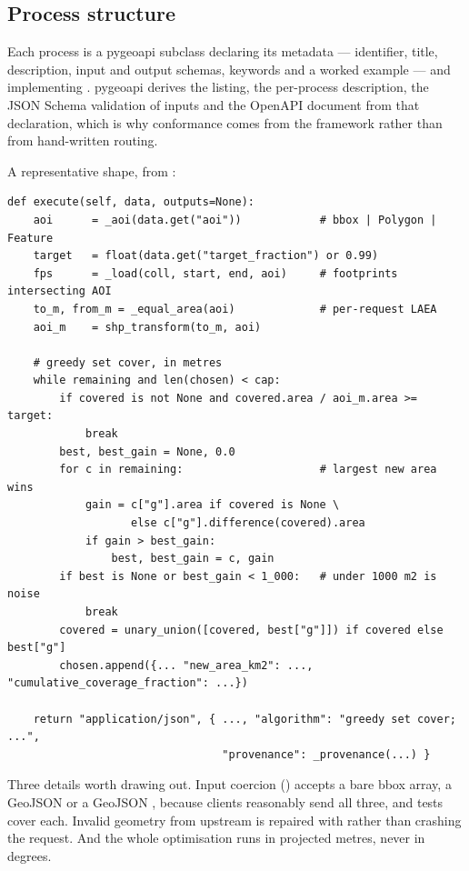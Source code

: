 \subsection{Process structure}

Each process is a pygeoapi  subclass declaring its
metadata --- identifier, title, description, input and output schemas,
keywords and a worked example --- and implementing . pygeoapi
derives the  listing, the per-process description, the JSON
Schema validation of inputs and the OpenAPI document from that declaration,
which is why conformance comes from the framework rather than from
hand-written routing.

A representative shape, from :

\begin{lstlisting}
def execute(self, data, outputs=None):
    aoi      = _aoi(data.get("aoi"))            # bbox | Polygon | Feature
    target   = float(data.get("target_fraction") or 0.99)
    fps      = _load(coll, start, end, aoi)     # footprints intersecting AOI
    to_m, from_m = _equal_area(aoi)             # per-request LAEA
    aoi_m    = shp_transform(to_m, aoi)

    # greedy set cover, in metres
    while remaining and len(chosen) < cap:
        if covered is not None and covered.area / aoi_m.area >= target:
            break
        best, best_gain = None, 0.0
        for c in remaining:                     # largest new area wins
            gain = c["g"].area if covered is None \
                   else c["g"].difference(covered).area
            if gain > best_gain:
                best, best_gain = c, gain
        if best is None or best_gain < 1_000:   # under 1000 m2 is noise
            break
        covered = unary_union([covered, best["g"]]) if covered else best["g"]
        chosen.append({... "new_area_km2": ..., "cumulative_coverage_fraction": ...})

    return "application/json", { ..., "algorithm": "greedy set cover; ...",
                                 "provenance": _provenance(...) }
\end{lstlisting}

Three details worth drawing out. Input coercion () accepts a bare
bbox array, a GeoJSON \code{Polygon} or a GeoJSON \code{Feature}, because
clients reasonably send all three, and tests cover each. Invalid geometry from
upstream is repaired with \code{buffer(0)} rather than crashing the request.
And the whole optimisation runs in projected metres, never in degrees.

